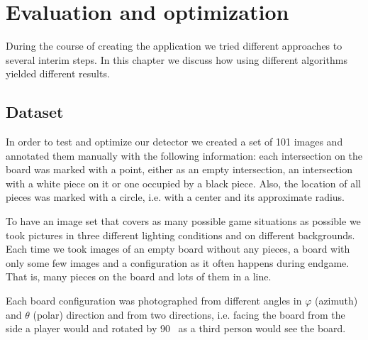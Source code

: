 
\chapter{Evaluation and optimization}
	During the course of creating the application we tried different approaches to several interim steps. In this chapter we discuss how using different algorithms yielded different results.

	\section{Dataset}
	In order to test and optimize our detector we created a set of 101 images and annotated them manually with the following information: each intersection on the board was marked with a point, either as an empty intersection, an intersection with a white piece on it or one occupied by a black piece. Also, the location of all pieces was marked with a circle, i.e. with a center and its approximate radius.

	To have an image set that covers as many possible game situations as possible we took pictures in three different lighting conditions and on different backgrounds. Each time we took images of an empty board without any pieces, a board with only some few images and a configuration as it often happens during endgame. That is, many pieces on the board and lots of them in a line.

	Each board configuration was photographed from different angles in $\varphi$ (azimuth) and $\theta$ (polar) direction and from two directions, i.e. facing the board from the side a player would and rotated by 90\textdegree~ as a third person would see the board.

